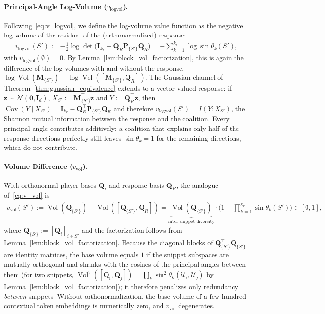 \documentclass{article}
\begin{document}
\paragraph{Principal-Angle Log-Volume ($v_{\text{logvol}}$).}
Following~\eqref{eq:v_logvol}, we define the log-volume value function as the negative log-volume of the residual of the (orthonormalized) response:
\begin{align}\label{eq:set_v_logvol}
    v_{\text{logvol}}(S') := -\frac{1}{2} \log \det \big(\mathbf{I}_{k_r} - \mathbf{Q}_R^\top \mathbf{P}_{\{S'\}} \mathbf{Q}_R\big) = -\sum_{k=1}^{k_r} \log \sin \theta_k(S'),
\end{align}
with $v_{\text{logvol}}(\emptyset) = 0$. By Lemma~\ref{lem:block_vol_factorization}, this is again the difference of the log-volumes with and without the response, $\log \operatorname{Vol}(\mathbf{M}_{\{S'\}}) - \log \operatorname{Vol}([\mathbf{M}_{\{S'\}}, \mathbf{Q}_R])$. The Gaussian channel of Theorem~\ref{thm:gaussian_equivalence} extends to a vector-valued response: if $\mathbf{z} \sim \mathcal{N}(\mathbf{0}, \mathbf{I}_d)$, $X_{S'} := \mathbf{M}_{\{S'\}}^\top \mathbf{z}$ and $Y := \mathbf{Q}_R^\top \mathbf{z}$, then $\operatorname{Cov}(Y \mid X_{S'}) = \mathbf{I}_{k_r} - \mathbf{Q}_R^\top \mathbf{P}_{\{S'\}} \mathbf{Q}_R$ and therefore $v_{\text{logvol}}(S') = I(Y; X_{S'})$, the Shannon mutual information between the response and the coalition. Every principal angle contributes additively: a coalition that explains only half of the response directions perfectly still leaves $\sin \theta_k = 1$ for the remaining directions, which do not contribute.

\paragraph{Volume Difference ($v_{\text{vol}}$).}
With orthonormal player bases $\mathbf{Q}_i$ and response basis $\mathbf{Q}_R$, the analogue of~\eqref{eq:v_vol} is
\begin{align}\label{eq:set_v_vol}
    v_{\text{vol}}(S') := \operatorname{Vol}(\mathbf{Q}_{\{S'\}}) - \operatorname{Vol}([\mathbf{Q}_{\{S'\}}, \mathbf{Q}_R]) = \underbrace{\operatorname{Vol}(\mathbf{Q}_{\{S'\}})}_{\text{inter-snippet diversity}} \cdot \Big(1 - \prod_{k=1}^{k_r} \sin \theta_k(S')\Big) \in [0, 1],
\end{align}
where $\mathbf{Q}_{\{S'\}} := [\mathbf{Q}_i]_{i \in S'}$ and the factorization follows from Lemma~\ref{lem:block_vol_factorization}. Because the diagonal blocks of $\mathbf{Q}_{\{S'\}}^\top \mathbf{Q}_{\{S'\}}$ are identity matrices, the base volume equals $1$ if the snippet subspaces are mutually orthogonal and shrinks with the cosines of the principal angles between them (for two snippets, $\operatorname{Vol}^2([\mathbf{Q}_i, \mathbf{Q}_j]) = \prod_k \sin^2 \theta_k(\mathcal{U}_i, \mathcal{U}_j)$ by Lemma~\ref{lem:block_vol_factorization}); it therefore penalizes only redundancy \emph{between} snippets. Without orthonormalization, the base volume of a few hundred contextual token embeddings is numerically zero, and $v_{\text{vol}}$ degenerates.
\end{document}
